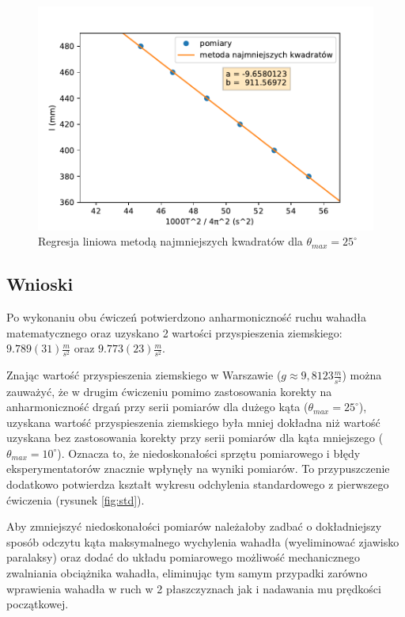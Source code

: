 \documentclass[a4paper]{article}
\newlength{\du}
\begin{document}
\begin{figure}[h]
\centering
	\includegraphics[scale=0.6]{wykres-4_0.pdf}
\caption{Regresja liniowa metodą najmniejszych kwadratów dla $\theta_{max} = 25^\circ$}
\label{regresja_25}
\end{figure}


\subsection{Wnioski}
Po wykonaniu obu ćwiczeń potwierdzono anharmoniczność ruchu wahadła matematycznego oraz uzyskano
2 wartości przyspieszenia ziemskiego: $9.789(31) \tfrac{m}{s^2}$ oraz $9.773(23) \tfrac{m}{s^2}$.

Znając wartość przyspieszenia ziemskiego w Warszawie ($g\approx9,8123 \tfrac{m}{s^2}$)
można zauważyć, że w drugim ćwiczeniu pomimo zastosowania korekty na anharmoniczność drgań
przy serii pomiarów dla dużego kąta ($\theta_{max} = 25^\circ$), uzyskana wartość
przyspieszenia ziemskiego była mniej dokładna niż wartość uzyskana bez zastosowania
korekty przy serii pomiarów dla kąta mniejszego ($\theta_{max} = 10^\circ$).
Oznacza to, że niedoskonałości sprzętu pomiarowego i błędy eksperymentatorów znacznie
wpłynęły na wyniki pomiarów.
To przypuszczenie dodatkowo potwierdza kształt wykresu odchylenia standardowego
z pierwszego ćwiczenia (rysunek \ref{fig:std}).


Aby zmniejszyć niedoskonałości pomiarów należałoby zadbać o dokładniejszy sposób odczytu
kąta maksymalnego wychylenia wahadła (wyeliminować zjawisko paralaksy) oraz dodać do
układu pomiarowego możliwość mechanicznego zwalniania obciążnika wahadła, eliminując tym
samym przypadki zarówno wprawienia wahadła w ruch w 2 płaszczyznach 
jak i nadawania mu prędkości początkowej.
\end{document}
